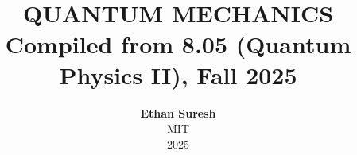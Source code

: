 \documentclass[openany,oneside]{book}
\begin{document}
\title{ \normalsize \textsc{}
		\\ [2.0cm]
		\HRule{1.5pt} \\
		\LARGE \textbf{\uppercase{Quantum Mechanics}
		\HRule{2.0pt} \\ [0.6cm] \LARGE{Compiled from 8.05 (Quantum Physics II), Fall 2025} \vspace*{10\baselineskip}}
		}
\date{}
\author{\textbf{Ethan Suresh} \\
		MIT \\
		2025}

\maketitle
\newpage

\tableofcontents
\newpage














\end{document}
